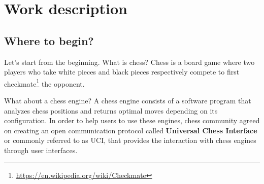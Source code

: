 \chapter{Work description}
\label{cap:descripcionTrabajo}






\section{Where to begin?}

Let's start from the beginning. What is chess? Chess is a board game where two players who take white pieces and black pieces respectively compete to first checkmate\footnote{\url{https://en.wikipedia.org/wiki/Checkmate}} the opponent.

What about a chess engine? A chess engine consists of a software program that analyzes chess positions and returns optimal moves depending on its configuration. In order to help users to use these engines, chess community agreed on creating an open communication protocol called \textbf{Universal Chess Interface} or commonly referred to as UCI, that provides the interaction with chess engines through user interfaces.

